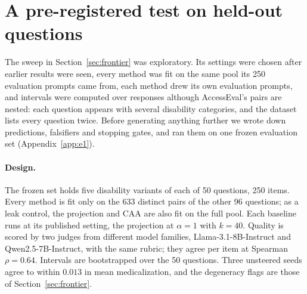 \section{A pre-registered test on held-out questions}
\label{sec:confirm}

The sweep in Section~\ref{sec:frontier} was exploratory. Its settings were chosen after
earlier results were seen, every method was fit on the same pool its 250 evaluation
prompts came from, each method drew its own evaluation prompts, and intervals were
computed over responses although AccessEval's pairs are nested: each question appears
with several disability categories, and the dataset lists every question twice. Before
generating anything further we wrote down predictions, falsifiers and stopping gates, and
ran them on one frozen evaluation set (Appendix~\ref{app:e1}).

\paragraph{Design.} The frozen set holds five disability variants of each of 50
questions, 250 items. Every method is fit only on the 633 distinct pairs of the other 96
questions; as a leak control, the projection and CAA are also fit on the full pool. Each
baseline runs at its published setting, the projection at $\alpha{=}1$ with $k{=}40$.
Quality is scored by two judges from different model families, Llama-3.1-8B-Instruct and
Qwen2.5-7B-Instruct, with the same rubric; they agree per item at Spearman
$\rho{=}0.64$. Intervals are bootstrapped over the 50 questions. Three unsteered seeds
agree to within $0.013$ in mean medicalization, and the degeneracy flags are those of
Section~\ref{sec:frontier}.

